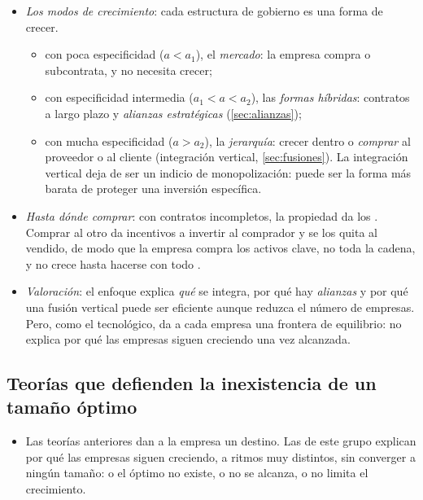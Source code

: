 \documentclass[11pt]{article}
\begin{document}
\begin{itemize}
\item \emph{Los modos de crecimiento}: cada estructura de gobierno es una forma de crecer.
  \begin{itemize}
  \item con poca especificidad ($a<a_1$), el \emph{mercado}: la empresa compra o subcontrata, y no necesita crecer;
  \item con especificidad intermedia ($a_1<a<a_2$), las \emph{formas híbridas}: contratos a largo plazo y \emph{alianzas estratégicas} (\ref{sec:alianzas});
  \item con mucha especificidad ($a>a_2$), la \emph{jerarquía}: crecer dentro o \emph{comprar} al proveedor o al cliente (integración vertical, \ref{sec:fusiones}). La integración vertical deja de ser un indicio de monopolización: puede ser la forma más barata de proteger una inversión específica.
  \end{itemize}
\item \emph{Hasta dónde comprar}: con contratos incompletos, la propiedad da los \nocite{GrossmanHart1986Costs,HartMoore1990Property}. Comprar al otro da incentivos a invertir al comprador y se los quita al vendido, de modo que la empresa compra los activos clave, no toda la cadena, y no crece hasta hacerse con todo .
\item \emph{Valoración}: el enfoque explica \emph{qué} se integra, por qué hay \emph{alianzas} y por qué una fusión vertical puede ser eficiente aunque reduzca el número de empresas. Pero, como el tecnológico, da a cada empresa una frontera de equilibrio: no explica por qué las empresas siguen creciendo una vez alcanzada.
\end{itemize}

\subsection{Teorías que defienden la inexistencia de un tamaño óptimo}\label{sec:sin-optimo}

\begin{itemize}
\item Las teorías anteriores dan a la empresa un destino. Las de este grupo explican por qué las empresas siguen creciendo, a ritmos muy distintos, sin converger a ningún tamaño: o el óptimo no existe, o no se alcanza, o no limita el crecimiento.
\end{itemize}
\end{document}
